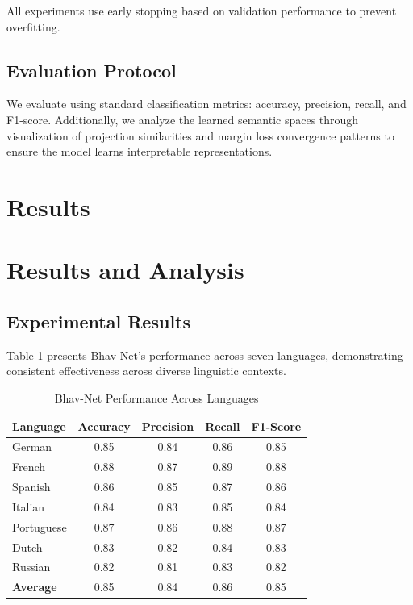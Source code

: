\documentclass[11pt]{article}
\begin{document}
All experiments use early stopping based on validation performance to prevent overfitting.

\subsection{Evaluation Protocol}

We evaluate using standard classification metrics: accuracy, precision, recall, and F1-score. Additionally, we analyze the learned semantic spaces through visualization of projection similarities and margin loss convergence patterns to ensure the model learns interpretable representations.

\section{Results}

\section{Results and Analysis}

\subsection{Experimental Results}
Table \ref{tab:results} presents Bhav-Net's performance across seven languages, demonstrating consistent effectiveness across diverse linguistic contexts.

\begin{table}[htbp]
\caption{Bhav-Net Performance Across Languages}
\begin{center}
\begin{tabular}{|l|c|c|c|c|}
\hline
\textbf{Language} & \textbf{Accuracy} & \textbf{Precision} & \textbf{Recall} & \textbf{F1-Score} \\
\hline
German & 0.85 & 0.84 & 0.86 & 0.85 \\
\hline
French & 0.88 & 0.87 & 0.89 & 0.88 \\
\hline
Spanish & 0.86 & 0.85 & 0.87 & 0.86 \\
\hline
Italian & 0.84 & 0.83 & 0.85 & 0.84 \\
\hline
Portuguese & 0.87 & 0.86 & 0.88 & 0.87 \\
\hline
Dutch & 0.83 & 0.82 & 0.84 & 0.83 \\
\hline
Russian & 0.82 & 0.81 & 0.83 & 0.82 \\
\hline
\hline
\textbf{Average} & 0.85 & 0.84 & 0.86 & 0.85 \\
\hline
\end{tabular}
\label{tab:results}
\end{center}
\end{table}
\end{document}
